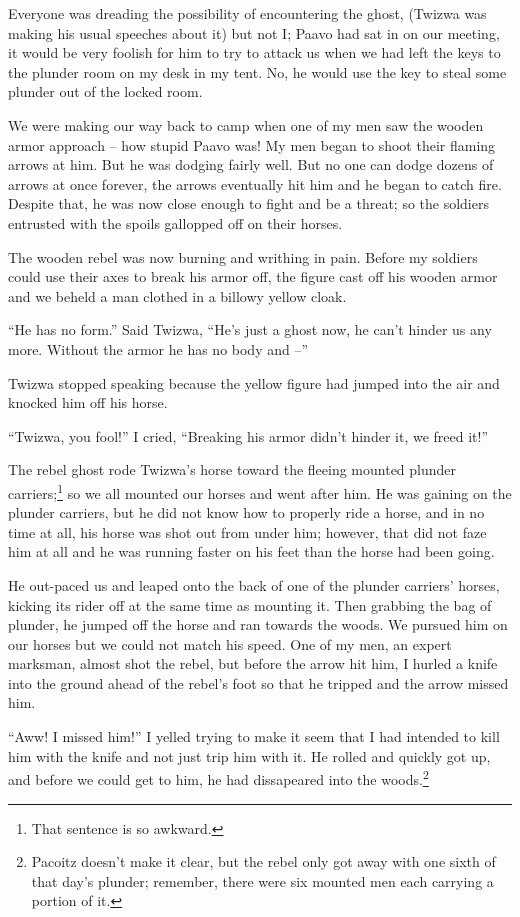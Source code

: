 Everyone was dreading the possibility of encountering the ghost, (Twi\-zwa was making his usual speeches about it) but not I; Paa\-vo had sat in on our meeting, it would be very foolish for him to try to attack us when we had left the keys to the plunder room on my desk in my tent. No, he would use the key to steal some plunder out of the locked room.

We were making our way back to camp when one of my men saw the wooden armor approach -- how stupid Paa\-vo was! My men began to shoot their flaming arrows at him. But he was dodging fairly well. But no one can dodge dozens of arrows at once forever, the arrows eventually hit him and he began to catch fire. Despite that, he was now close enough to fight and be a threat; so the soldiers entrusted with the spoils gallopped off on their horses.

The wooden rebel was now burning and writhing in pain. Before my soldiers could use their axes to break his armor off, the figure cast off his wooden armor and we beheld a man clothed in a billowy yellow cloak.

``He has no form.'' Said Twi\-zwa, ``He's just a ghost now, he can't hinder us any more. Without the armor he has no body and --''

Twi\-zwa stopped speaking because the yellow figure had jumped into the air and knocked him off his horse.

``Twi\-zwa, you fool!'' I cried, ``Breaking his armor didn't hinder it, we freed it!''

The rebel ghost rode Twi\-zwa's horse toward the fleeing mounted plunder carriers;\footnote{That sentence is so awkward.} so we all mounted our horses and went after him. He was gaining on the plunder carriers, but he did not know how to properly ride a horse, and in no time at all, his horse was shot out from under him; however, that did not faze him at all and he was running faster on his feet than the horse had been going.

He out-paced us and leaped onto the back of one of the plunder carriers' horses, kicking its rider off at the same time as mounting it. Then grabbing the bag of plunder, he jumped off the horse and ran towards the woods. We pursued him on our horses but we could not match his speed. One of my men, an expert marksman, almost shot the rebel, but before the arrow hit him, I hurled a knife into the ground ahead of the rebel's foot so that he tripped and the arrow missed him.

``Aww! I missed him!'' I yelled trying to make it seem that I had intended to kill him with the knife and not just trip him with it. He rolled and quickly got up, and before we could get to him, he had dissapeared into the woods.\footnote{Pa\-co\-itz doesn't make it clear, but the rebel only got away with one sixth of that day's plunder; remember, there were six mounted men each carrying a portion of it.} 

